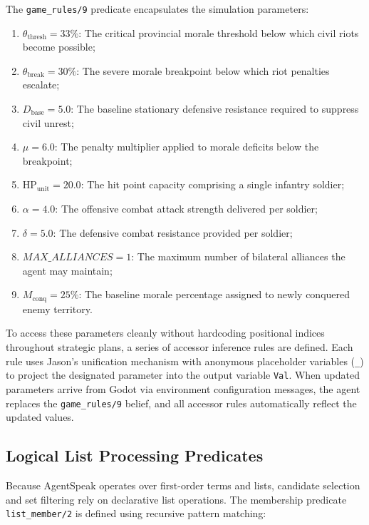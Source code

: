 The \texttt{game\_rules/9} predicate encapsulates the simulation parameters:
\begin{enumerate}[label=(\roman*)]
    \item $\theta_{\text{thresh}} = 33\%$: The critical provincial morale threshold below which civil riots become possible;
    \item $\theta_{\text{break}} = 30\%$: The severe morale breakpoint below which riot penalties escalate;
    \item $D_{\text{base}} = 5.0$: The baseline stationary defensive resistance required to suppress civil unrest;
    \item $\mu = 6.0$: The penalty multiplier applied to morale deficits below the breakpoint;
    \item $\text{HP}_{\text{unit}} = 20.0$: The hit point capacity comprising a single infantry soldier;
    \item $\alpha = 4.0$: The offensive combat attack strength delivered per soldier;
    \item $\delta = 5.0$: The defensive combat resistance provided per soldier;
    \item $\mathit{MAX\_ALLIANCES} = 1$: The maximum number of bilateral alliances the agent may maintain;
    \item $M_{\text{conq}} = 25\%$: The baseline morale percentage assigned to newly conquered enemy territory.
\end{enumerate}

To access these parameters cleanly without hardcoding positional indices throughout strategic plans, a series of accessor inference rules are defined. Each rule uses Jason's unification mechanism with anonymous placeholder variables (\texttt{\_}) to project the designated parameter into the output variable \texttt{Val}. When updated parameters arrive from Godot via environment configuration messages, the agent replaces the \texttt{game\_rules/9} belief, and all accessor rules automatically reflect the updated values.

\subsection{Logical List Processing Predicates}
\label{sec:impl_list_utils}

Because AgentSpeak operates over first-order terms and lists, candidate selection and set filtering rely on declarative list operations. The membership predicate \texttt{list\_member/2} is defined using recursive pattern matching:

